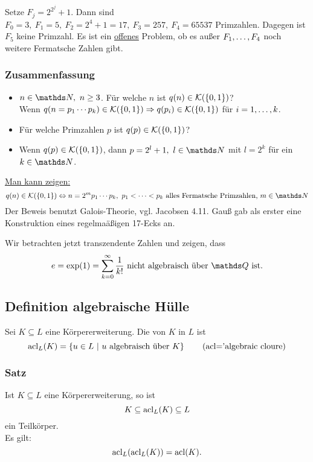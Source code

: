 Setze $F_j=2^{2^j}+1$.
Dann sind $F_0=3,~F_1=5,~F_2=2^4+1=17,~F_3=257,~F_4=65537$ Primzahlen.
Dagegen ist $F_5$ keine Primzahl.
Es ist ein \uline{offenes} Problem, ob es außer $F_1, \dots ,F_4$ noch weitere Fermatsche Zahlen gibt.

\subsubsection*{Zusammenfassung}
\begin{itemize}
	\item $n\in \N,~n\ge3$.
	Für welche $n$ ist $q(n)\in\mathcal{K}(\{0,1\})$?\\
	Wenn $q(n=p_1\cdots p_k)\in \mathcal{K}(\{0,1\})\Rightarrow q(p_i)\in\mathcal{K}(\{0,1\})$ für $i=1, \dots ,k$.
	\item Für welche Primzahlen $p$ ist $q(p)\in\mathcal{K}(\{0,1\})$?
	\item Wenn $q(p)\in\mathcal{K}(\{0,1\})$, dann $p=2^l+1,~l\in\N$ mit $l=2^k$ für ein $k\in\N$.
\end{itemize}
\uline{Man kann zeigen:}
\[
q(n)\in\mc{K}(\{0,1\})\Leftrightarrow n=2^mp_1\cdots p_k,~p_1\dt{<}p_k \text{ alles Fermatsche Primzahlen, }m\in\N
\]
Der Beweis benutzt Galois-Theorie, vgl. Jacobsen 4.11.
Gauß gab als erster eine Konstruktion eines regelmaäßigen 17-Ecks an.

Wir betrachten jetzt transzendente Zahlen und zeigen, dass
\[
e=\exp(1)=\sum_{k=0}^{\infty}\frac{1}{k!} \text{ nicht algebraisch über }\Q\text{ ist.}
\]

\subsection{Definition algebraische Hülle}
\label{sub:alg_huelle}
Sei $K\subseteq L$ eine Körpererweiterung.
Die  von $K$ in $L$ ist
\[
\operatorname{acl}_L(K)=\left\{u\in L~|~ u \text{ algebraisch über }K\right\}\qquad(\text{acl='algebraic cloure})
\]

\subsubsection*{Satz}
Ist $K\subseteq L$ eine Körpererweiterung, so ist 
\[
K\subseteq \operatorname{acl}_L(K)\subseteq L
\] 
ein Teilkörper.\\
Es gilt:
\[
\operatorname{acl}_L(\operatorname{acl}_L(K))=\operatorname{acl}(K).
\]

\\





\cleardoubleoddemptypage
{}
\setcounter{page}{1}




\printindex
\listoffigures
